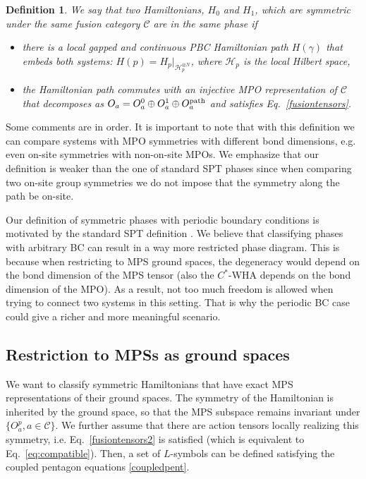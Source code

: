 \documentclass[a4paper,twocolumn,11pt,accepted=2023-02-10]{quantumarticle}
\newtheorem{definition}{Definition}
\begin{document}
\begin{definition}\label{defphase}
We say that two Hamiltonians, $H_0$ and $H_1$, which are symmetric under the same fusion category $\mathcal{C}$ are in the same phase if 
\begin{itemize}
    \item there is a local gapped and continuous PBC Hamiltonian path $H(\gamma)$ that embeds both systems: $H(p)= H_p|_{\mathcal{H}^{\otimes N }_p}$, where $\mathcal{H}_p$ is the local Hilbert space,
    
    \item the Hamiltonian path commutes with an injective MPO representation of $\mathcal{C}$ that decomposes as $O_a= O^0_a \oplus O^1_a \oplus O^{\rm path}_a$ and satisfies Eq.\ \eqref{fusiontensors}.
\end{itemize} 
\end{definition}
Some comments are in order. It is important to note that with this definition we can compare systems with MPO symmetries with different bond dimensions, e.g. even on-site symmetries with non-on-site MPOs. We emphasize that our definition is weaker than the one of standard SPT phases since when comparing two on-site group symmetries we do not impose that the symmetry along the path be on-site. 

Our definition of symmetric phases with periodic boundary conditions is motivated by the standard SPT definition \cite{Chen11,Schuch11}. We believe that classifying phases with arbitrary BC can result in a way more restricted phase diagram. This is because when restricting to MPS ground spaces, the degeneracy would depend on the bond dimension of the MPS tensor (also the $C^*$-WHA depends on the bond dimension of the MPO). As a result, not too much freedom is allowed when trying to connect two systems in this setting. That is why the periodic BC case could give a richer and more meaningful scenario. 

\subsection{Restriction to MPSs as ground spaces}

We want to classify symmetric Hamiltonians that have exact MPS representations of their ground spaces. The symmetry of the Hamiltonian is inherited by the ground space, so that the MPS subspace remains invariant under $\{O^p_a, a\in \mathcal{C} \}$. We further assume that there are action tensors locally realizing this symmetry, i.e. Eq.\ \eqref{fusiontensors2} is satisfied (which is equivalent to Eq.\ \eqref{eq:compatible}). Then, a set of ${L}$-symbols can be defined satisfying the coupled pentagon equations \eqref{coupledpent}. 
\end{document}
